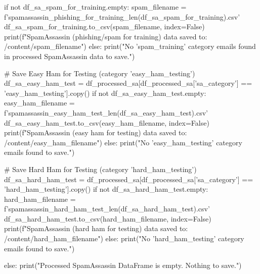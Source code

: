 \begin{ffcode}
    if not df_sa_spam_for_training.empty:
        spam_filename = f'spamassassin_phishing_for_training_{len(df_sa_spam_for_training)}.csv'
        df_sa_spam_for_training.to_csv(spam_filename, index=False)
        print(f"SpamAssassin (phishing/spam for training) data saved to: /content/{spam_filename}")
    else:
        print("No 'spam_training' category emails found in processed SpamAssassin data to save.")

    # Save Easy Ham for Testing (category 'easy_ham_testing')
    df_sa_easy_ham_test = df_processed_sa[df_processed_sa['sa_category'] == 'easy_ham_testing'].copy()
    if not df_sa_easy_ham_test.empty:
        easy_ham_filename = f'spamassassin_easy_ham_test_{len(df_sa_easy_ham_test)}.csv'
        df_sa_easy_ham_test.to_csv(easy_ham_filename, index=False)
        print(f"SpamAssassin (easy ham for testing) data saved to: /content/{easy_ham_filename}")
    else:
        print("No 'easy_ham_testing' category emails found to save.")

    # Save Hard Ham for Testing (category 'hard_ham_testing')
    df_sa_hard_ham_test = df_processed_sa[df_processed_sa['sa_category'] == 'hard_ham_testing'].copy()
    if not df_sa_hard_ham_test.empty:
        hard_ham_filename = f'spamassassin_hard_ham_test_{len(df_sa_hard_ham_test)}.csv'
        df_sa_hard_ham_test.to_csv(hard_ham_filename, index=False)
        print(f"SpamAssassin (hard ham for testing) data saved to: /content/{hard_ham_filename}")
    else:
        print("No 'hard_ham_testing' category emails found to save.")

else:
    print("Processed SpamAssassin DataFrame is empty. Nothing to save.")
\end{ffcode}